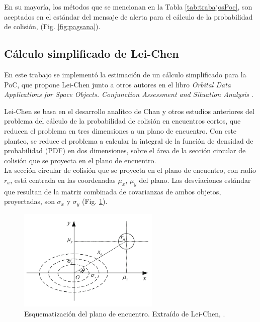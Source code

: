 En su mayor\'ia, los m\'etodos que se mencionan en la Tabla \ref{tab:trabajosPoc}, son aceptados en el est\'andar del mensaje de alerta para el c\'alculo de la probabilidad de colisi\'on, (Fig. \ref{fig:pagsana}).

% 
  

\subsection{C\'alculo simplificado de Lei-Chen}\label{subsec:pocsimp}

En este trabajo se implement\'o la estimaci\'on de un c\'alculo simplificado para la PoC, que propone Lei-Chen junto a otros autores en el libro 
{\it{Orbital Data Applications for Space Objects. Conjunction Assessment and Situation Analysis}} \citep{leichen}.

Lei-Chen se basa en el desarrollo anal\'itco de Chan \citep{chan2003improved} y otros estudios anteriores del problema del c\'alculo de la probabilidad de colisi\'on en encuentros cortos, que reducen el problema en tres dimensiones a un plano de encuentro.
Con este planteo, se reduce el problema a calcular la integral de la funci\'on de densidad de probabilidad (PDF) en dos dimensiones, sobre el \'area de la secci\'on circular de colisi\'on que se proyecta en el plano de encuentro.\\

La secci\'on circular de colisi\'on que se proyecta en el plano de encuentro, con radio $r_{a}$, est\'a centrada en las coordenadas $\mu_{x}$, $\mu_{y}$ del plano. Las desviaciones est\'andar que resultan de la matriz combinada de covarianzas de ambos objetos, proyectadas, son $\sigma_{x}$ y $\sigma_{y}$  (Fig. \ref{fig:planoenc}).\\

\begin{figure}[!h]
\centering
\includegraphics[width=0.6\textwidth]{imagenes/planodeencuentro}
\caption[Plano de Encuentro]{Esquematizaci\'on del plano de encuentro. Extra\'ido de Lei-Chen, \citep{leichen}.}
\label{fig:planoenc}
\end{figure}

